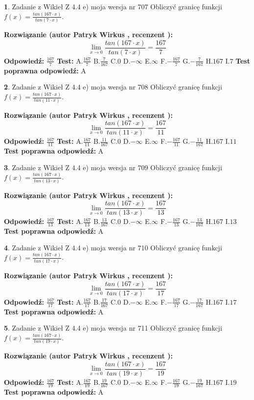 \documentclass[12pt, a4paper]{article}
\theoremstyle{definition} %
\newtheorem{zad}{}
\newcommand{\zadStart}[1]{\begin{zad}#1\newline}
\newcommand{\zadStop}{\end{zad}}
\newcommand{\rozwStart}[2]{\noindent \textbf{Rozwiązanie (autor #1 , recenzent #2): }\newline}
\newcommand{\rozwStop}{\newline}
\newcommand{\odpStart}{\noindent \textbf{Odpowiedź:}\newline}
\newcommand{\odpStop}{\newline}
\newcommand{\testStart}{\noindent \textbf{Test:}\newline}
\newcommand{\testStop}{\newline}
\newcommand{\kluczStart}{\noindent \textbf{Test poprawna odpowiedź:}\newline}
\newcommand{\kluczStop}{\newline}
\begin{document}
\zadStart{Zadanie z Wikieł Z 4.4 e) moja wersja nr 707}
Obliczyć granicę funkcji $f(x)=\frac{tan(167\cdot x)}{tan(7\cdot x)}$.
\zadStop
\rozwStart{Patryk Wirkus}{}
$$\lim\limits_{x\to 0}\frac{tan(167\cdot x)}{tan(7\cdot x)}=
\frac{167}{7}$$
\rozwStop
\odpStart
$\frac{167}{7}$
\odpStop
\testStart
A.$\frac{167}{7}$
B.$\frac{7}{167}$
C.$0$
D.$-\infty$
E.$\infty$
F.$-\frac{167}{7}$
G.$-\frac{7}{167}$
H.$167$
I.$7$
\testStop
\kluczStart
A
\kluczStop



\zadStart{Zadanie z Wikieł Z 4.4 e) moja wersja nr 708}
Obliczyć granicę funkcji $f(x)=\frac{tan(167\cdot x)}{tan(11\cdot x)}$.
\zadStop
\rozwStart{Patryk Wirkus}{}
$$\lim\limits_{x\to 0}\frac{tan(167\cdot x)}{tan(11\cdot x)}=
\frac{167}{11}$$
\rozwStop
\odpStart
$\frac{167}{11}$
\odpStop
\testStart
A.$\frac{167}{11}$
B.$\frac{11}{167}$
C.$0$
D.$-\infty$
E.$\infty$
F.$-\frac{167}{11}$
G.$-\frac{11}{167}$
H.$167$
I.$11$
\testStop
\kluczStart
A
\kluczStop



\zadStart{Zadanie z Wikieł Z 4.4 e) moja wersja nr 709}
Obliczyć granicę funkcji $f(x)=\frac{tan(167\cdot x)}{tan(13\cdot x)}$.
\zadStop
\rozwStart{Patryk Wirkus}{}
$$\lim\limits_{x\to 0}\frac{tan(167\cdot x)}{tan(13\cdot x)}=
\frac{167}{13}$$
\rozwStop
\odpStart
$\frac{167}{13}$
\odpStop
\testStart
A.$\frac{167}{13}$
B.$\frac{13}{167}$
C.$0$
D.$-\infty$
E.$\infty$
F.$-\frac{167}{13}$
G.$-\frac{13}{167}$
H.$167$
I.$13$
\testStop
\kluczStart
A
\kluczStop



\zadStart{Zadanie z Wikieł Z 4.4 e) moja wersja nr 710}
Obliczyć granicę funkcji $f(x)=\frac{tan(167\cdot x)}{tan(17\cdot x)}$.
\zadStop
\rozwStart{Patryk Wirkus}{}
$$\lim\limits_{x\to 0}\frac{tan(167\cdot x)}{tan(17\cdot x)}=
\frac{167}{17}$$
\rozwStop
\odpStart
$\frac{167}{17}$
\odpStop
\testStart
A.$\frac{167}{17}$
B.$\frac{17}{167}$
C.$0$
D.$-\infty$
E.$\infty$
F.$-\frac{167}{17}$
G.$-\frac{17}{167}$
H.$167$
I.$17$
\testStop
\kluczStart
A
\kluczStop



\zadStart{Zadanie z Wikieł Z 4.4 e) moja wersja nr 711}
Obliczyć granicę funkcji $f(x)=\frac{tan(167\cdot x)}{tan(19\cdot x)}$.
\zadStop
\rozwStart{Patryk Wirkus}{}
$$\lim\limits_{x\to 0}\frac{tan(167\cdot x)}{tan(19\cdot x)}=
\frac{167}{19}$$
\rozwStop
\odpStart
$\frac{167}{19}$
\odpStop
\testStart
A.$\frac{167}{19}$
B.$\frac{19}{167}$
C.$0$
D.$-\infty$
E.$\infty$
F.$-\frac{167}{19}$
G.$-\frac{19}{167}$
H.$167$
I.$19$
\testStop
\kluczStart
A
\kluczStop
\end{document}
